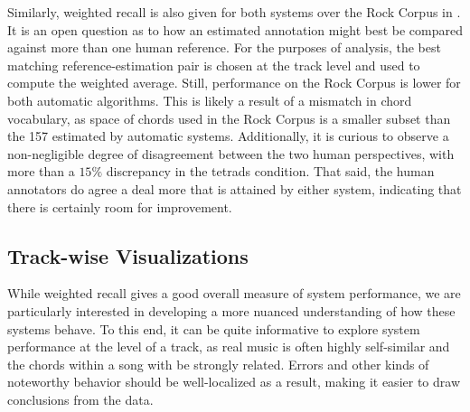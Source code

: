 \documentclass{article}
\begin{document}
Similarly, weighted recall is also given for both systems over the Rock Corpus in .
It is an open question as to how an estimated annotation might best be compared against more than one human reference.
For the purposes of analysis, the best matching reference-estimation pair is chosen at the track level and used to compute the weighted average.
Still, performance on the Rock Corpus is lower for both automatic algorithms.
This is likely a result of a mismatch in chord vocabulary, as space of chords used in the Rock Corpus is a smaller subset than the 157 estimated by automatic systems.
Additionally, it is curious to observe a non-negligible degree of disagreement between the two human perspectives, with more than a $15\%$ discrepancy in the tetrads condition.
That said, the human annotators do agree a deal more that is attained by either system, indicating that there is certainly room for improvement.


\subsection{Track-wise Visualizations}

While weighted recall gives a good overall measure of system performance, we are particularly interested in developing a more nuanced understanding of how these systems behave.
To this end, it can be quite informative to explore system performance at the level of a track, as real music is often highly self-similar and the chords within a song with be strongly related.
Errors and other kinds of noteworthy behavior should be well-localized as a result, making it easier to draw conclusions from the data.
\end{document}
